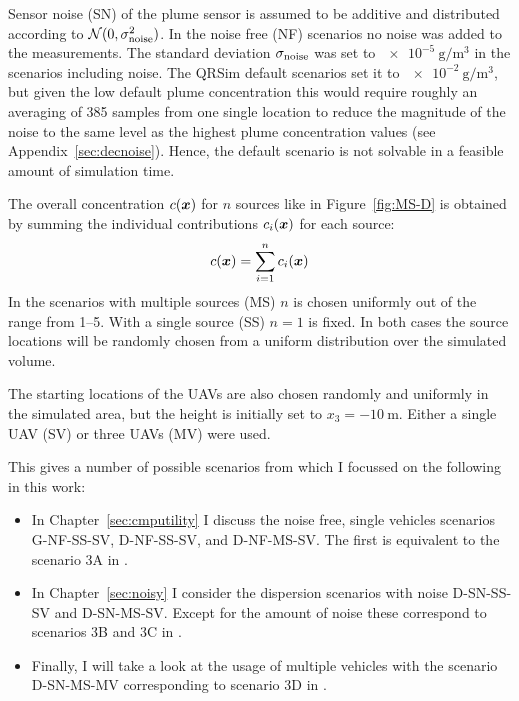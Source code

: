 Sensor noise (SN) of the plume sensor is assumed to be additive and distributed 
according to $\mathcal{N}(0, \sigma_{\mathrm{noise}}^2)$. In the noise free (NF) 
scenarios no noise was added to the measurements. The standard deviation 
$\sigma_{\mathrm{noise}}$ was set to $\SI{e-5}{\gram\per\meter\cubed}$ in the 
scenarios including noise.  The QRSim default scenarios set it to 
$\SI{e-2}{\gram\per\meter\cubed}$, but given the low default plume concentration 
this would require roughly an averaging of 385 samples from one single location 
to reduce the magnitude of the noise to the same level as the highest plume 
concentration values (see Appendix~\ref{sec:decnoise}).  Hence, the default 
scenario is not solvable in a feasible amount of simulation time.

The overall concentration $c(\bm{x})$ for $n$ sources like in 
Figure~\ref{fig:MS-D} is obtained by summing the individual contributions 
$c_i(\bm{x})$ for each source:
\begin{equation}
    c(\bm{x}) = \sum_{i = 1}^n c_i(\bm{x})
\end{equation}
In the scenarios with multiple sources (MS) $n$ is chosen uniformly out of the 
range from \numrange{1}{5}. With a single source (SS) $n = 1$ is fixed. In both 
cases the source locations will be randomly chosen from a uniform distribution 
over the simulated volume.

The starting locations of the UAVs are also chosen randomly and uniformly in the 
simulated area, but the height is initially set to $x_3 = \SI{-10}{\meter}$.  
Either a single UAV (SV) or three UAVs (MV) were used.

This gives a number of possible scenarios from which I focussed on the following 
in this work:
\begin{itemize}
    \item In Chapter~\ref{sec:cmputility} I discuss the noise free, single 
        vehicles scenarios G-NF-SS-SV, D-NF-SS-SV, and D-NF-MS-SV\@. The first 
        is equivalent to the scenario 3A in \textcite{denardi2013rn}.
    \item In Chapter~\ref{sec:noisy} I consider the dispersion scenarios with 
        noise D-SN-SS-SV and D-SN-MS-SV\@. Except for the amount of noise these 
        correspond to scenarios 3B and 3C in \textcite{denardi2013rn}.
    \item Finally, I will take a look at the usage of multiple vehicles with the 
        scenario D-SN-MS-MV corresponding to scenario 3D in 
        \textcite{denardi2013rn}.
\end{itemize}
